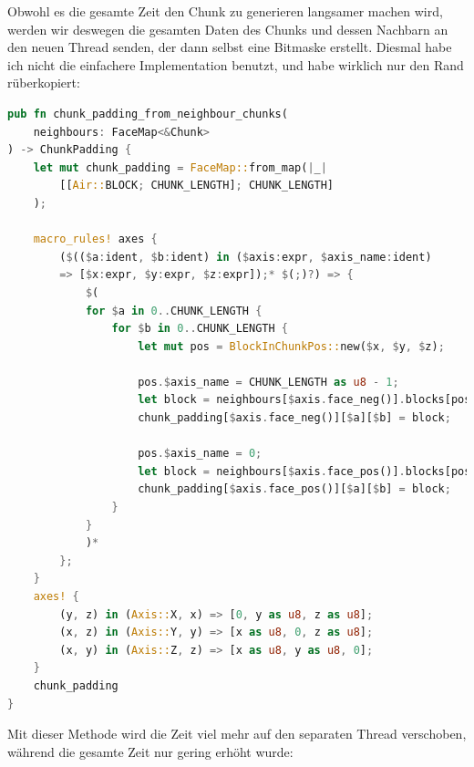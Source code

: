 Obwohl es die gesamte Zeit den Chunk zu generieren
langsamer machen wird, werden wir deswegen die gesamten
Daten des Chunks und dessen Nachbarn an den neuen
Thread senden, der dann selbst eine Bitmaske erstellt.
Diesmal habe ich nicht die einfachere Implementation
benutzt, und habe wirklich nur den Rand rüberkopiert:

\begin{lstlisting}[language=Rust]
pub fn chunk_padding_from_neighbour_chunks(
	neighbours: FaceMap<&Chunk>
) -> ChunkPadding {
	let mut chunk_padding = FaceMap::from_map(|_|
		[[Air::BLOCK; CHUNK_LENGTH]; CHUNK_LENGTH]
	);

	macro_rules! axes {
		($(($a:ident, $b:ident) in ($axis:expr, $axis_name:ident)
		=> [$x:expr, $y:expr, $z:expr]);* $(;)?) => {
			$(
			for $a in 0..CHUNK_LENGTH {
				for $b in 0..CHUNK_LENGTH {
					let mut pos = BlockInChunkPos::new($x, $y, $z);

					pos.$axis_name = CHUNK_LENGTH as u8 - 1;
					let block = neighbours[$axis.face_neg()].blocks[pos];
					chunk_padding[$axis.face_neg()][$a][$b] = block;

					pos.$axis_name = 0;
					let block = neighbours[$axis.face_pos()].blocks[pos];
					chunk_padding[$axis.face_pos()][$a][$b] = block;
				}
			}
			)*
		};
	}
	axes! {
		(y, z) in (Axis::X, x) => [0, y as u8, z as u8];
		(x, z) in (Axis::Y, y) => [x as u8, 0, z as u8];
		(x, y) in (Axis::Z, z) => [x as u8, y as u8, 0];
	}
	chunk_padding
}
\end{lstlisting}

Mit dieser Methode wird die Zeit viel mehr auf den
separaten Thread verschoben, während die gesamte
Zeit nur gering erhöht wurde:

\vspace{0.3cm}



